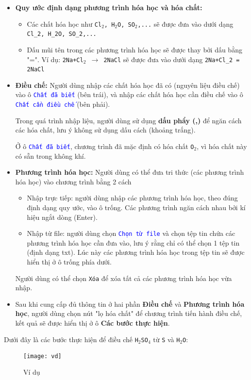 \documentclass[a4paper]{article}
\begin{document}
	\begin{itemize}
		\item \textbf{Quy ước định dạng phương trình hóa học và hóa chất:} 
		\begin{itemize}
			\item Các chất hóa học như \texttt{Cl$_2$, H$_2$O, SO$_2$,...} sẽ được đưa vào dưới dạng \texttt{Cl\_2, H\_2O, SO\_2,...}
			\item Dấu mũi tên trong các phương trình hóa học sẽ được thay bởi dấu bằng "=". Ví dụ: \texttt{2Na+Cl$_2$ $\rightarrow$ 2NaCl} sẽ được đưa vào dưới dạng \texttt{2Na+Cl\_2 = 2NaCl}
		\end{itemize}
		\item \textbf{Điều chế:} Người dùng nhập các chất hóa học đã có (nguyên liệu điều chế) vào ô \textcolor{blue}{\texttt{Chất đã biết}} (bên trái), và nhập các chất hóa học cần điều chế vào ô \textcolor{blue}{\texttt{Chất cần điều chế}} (bên phải). 
		
		Trong quá trình nhập liệu, người dùng sử dụng \textbf{dấu phẩy (,)} để ngăn cách các hóa chất, lưu ý không sử dụng dấu cách (khoảng trắng).
		
		Ở ô \textcolor{blue}{\texttt{Chất đã biết}}, chương trình đã mặc định có hóa chất \texttt{O$_2$}, vì hóa chất này có sẵn trong không khí.
		
		\item \textbf{Phương trình hóa học:} Người dùng có thể đưa tri thức (các phương trình hóa học) vào chương trình bằng 2 cách
		\begin{itemize}
			\item Nhập trực tiếp: người dùng nhập các phương trình hóa học, theo đúng định dạng quy ước, vào ô trống. Các phương trình ngăn cách nhau bởi kí hiệu ngắt dòng (Enter).
			\item Nhập từ file: người dùng chọn \textcolor{blue}{\texttt{Chọn từ file}} và chọn tệp tin chứa các phương trình hóa học cần đưa vào, lưu ý rằng chỉ có thể chọn 1 tệp tin (định dạng txt). Lúc này các phương trình hóa học trong tệp tin sẽ được hiển thị ở ô trống phía dưới.
		\end{itemize}
		Người dùng có thể chọn \texttt{Xóa} để xóa tất cả các phương trình hóa học vừa nhập.
		\item Sau khi cung cấp đủ thông tin ở hai phần \textbf{Điều chế} và \textbf{Phương trình hóa học}, người dùng chọn nút "lọ hóa chất" để chương trình tiến hành điều chế, kết quả sẽ được hiển thị ở ô \textbf{Các bước thực hiện}.
	\end{itemize}
Dưới đây là các bước thực hiện để điều chế \texttt{H$_2$SO$_4$} từ \texttt{S} và \texttt{H$_2$O}:
	\begin{figure}[h]
		\centering \texttt{[image: vd]}
		\caption{Ví dụ}
		\label{screen}
	\end{figure}
\end{document}

